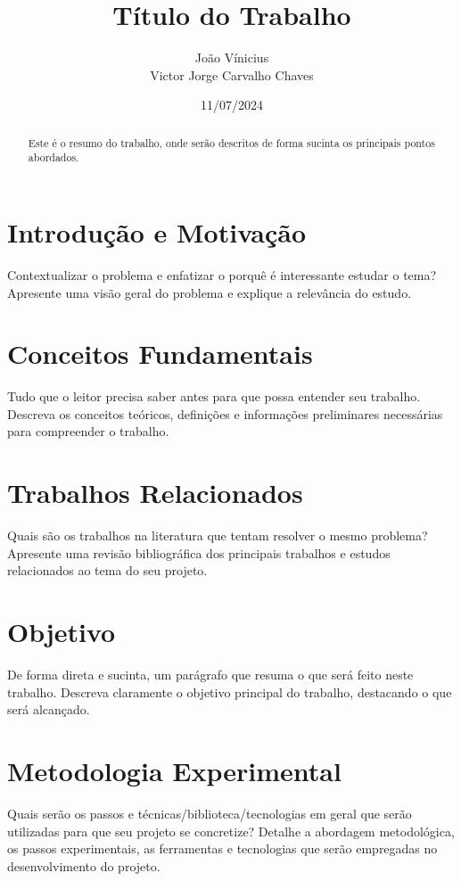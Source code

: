 \documentclass[a4paper,12pt]{article}
\title{Título do Trabalho}
\author{João Vínicius\\
Victor Jorge Carvalho Chaves}
\date{11/07/2024}
\begin{document}
\maketitle
\begin{abstract}
    Este é o resumo do trabalho, onde serão descritos de forma sucinta os principais pontos abordados.
\end{abstract}

\tableofcontents
\newpage

\section{Introdução e Motivação}
Contextualizar o problema e enfatizar o porquê é interessante estudar o tema?
Apresente uma visão geral do problema e explique a relevância do estudo.

\section{Conceitos Fundamentais}
Tudo que o leitor precisa saber antes para que possa entender seu trabalho.
Descreva os conceitos teóricos, definições e informações preliminares necessárias para compreender o trabalho.

\section{Trabalhos Relacionados}
Quais são os trabalhos na literatura que tentam resolver o mesmo problema?
Apresente uma revisão bibliográfica dos principais trabalhos e estudos relacionados ao tema do seu projeto.

\section{Objetivo}
De forma direta e sucinta, um parágrafo que resuma o que será feito neste trabalho.
Descreva claramente o objetivo principal do trabalho, destacando o que será alcançado.

\section{Metodologia Experimental}
Quais serão os passos e técnicas/biblioteca/tecnologias em geral que serão utilizadas para que seu projeto se concretize?
Detalhe a abordagem metodológica, os passos experimentais, as ferramentas e tecnologias que serão empregadas no desenvolvimento do projeto.
\end{document}
